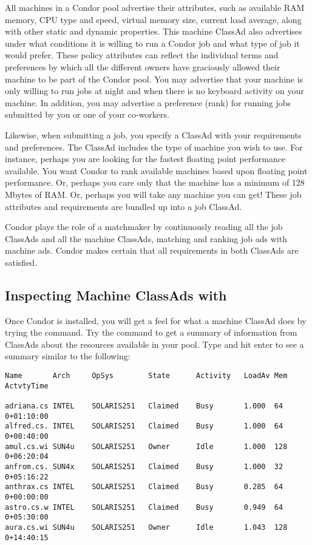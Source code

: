 All machines in a Condor pool advertise their attributes,
such as
available RAM memory, CPU type and speed, virtual memory size, current
load average, along with other static and dynamic properties.
This machine ClassAd
also advertises under what conditions it is
willing to run a Condor job and what type of job it would prefer. These
policy attributes can reflect the individual terms and preferences by
which all the different owners have graciously allowed their machine to
be part of the Condor pool. 
You may
advertise that your machine is only willing to run jobs at night
and when there is no keyboard activity on your machine.
In addition, you may
advertise a preference (rank) for running jobs submitted by you
or one of your co-workers. 

Likewise, when submitting a job, you specify a ClassAd with
your requirements and preferences.
The ClassAd
includes the
type of machine you  wish to use. For instance, perhaps you are
looking for the fastest floating point performance available.
You want Condor to rank available machines
based upon floating point performance. Or, perhaps you
care only that the machine has a minimum of 128 Mbytes of RAM.
Or, perhaps you will
take any machine you can get! These job attributes and requirements
are bundled up into a job ClassAd.

Condor plays the role of a matchmaker by continuously reading
all the job ClassAds and all the machine ClassAds, 
matching and ranking job ads with machine ads.
Condor makes certain that all
requirements in both ClassAds are satisfied. 

\subsection{Inspecting Machine ClassAds with }

Once Condor is installed,
you will get a feel for what
a machine ClassAd does by trying
the  command.
Try the  command to get
a summary of information from
ClassAds about the resources available in your pool.
Type  and hit enter to see a summary 
similar to the following:
\begin{center}
\begin{verbatim}
Name       Arch     OpSys        State      Activity   LoadAv Mem  ActvtyTime

adriana.cs INTEL    SOLARIS251   Claimed    Busy       1.000  64    0+01:10:00
alfred.cs. INTEL    SOLARIS251   Claimed    Busy       1.000  64    0+00:40:00
amul.cs.wi SUN4u    SOLARIS251   Owner      Idle       1.000  128   0+06:20:04
anfrom.cs. SUN4x    SOLARIS251   Claimed    Busy       1.000  32    0+05:16:22
anthrax.cs INTEL    SOLARIS251   Claimed    Busy       0.285  64    0+00:00:00
astro.cs.w INTEL    SOLARIS251   Claimed    Busy       0.949  64    0+05:30:00
aura.cs.wi SUN4u    SOLARIS251   Owner      Idle       1.043  128   0+14:40:15
\end{verbatim}
\Dots 
\end{center}


